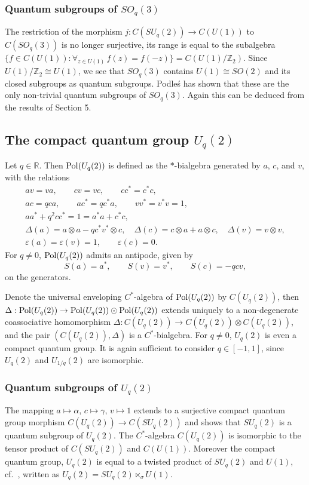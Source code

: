 \documentclass[12pt]{amsart}
\theoremstyle{definition}
\theoremstyle{remark}
\numberwithin{equation}{section}
\begin{document}
\subsubsection{Quantum subgroups of $SO_q(3)$}
The restriction of the morphism $j:C(SU_q(2))\to C(U(1))$ to $C(SO_q(3))$ is no longer surjective, its range is 
equal to the subalgebra $\{f\in C(U(1)): \forall_{z\in U(1)}\, f(z)=f(-z)\}=C(U(1)/\mathbb{Z}_2)$. Since 
$U(1)/\mathbb{Z}_2\cong U(1)$, we see that $SO_q(3)$ contains $U(1)\cong SO(2)$ and its closed subgroups as 
quantum subgroups. Podle\'s  \cite{podles95} has shown that these are the only non-trivial quantum subgroups of 
$SO_q(3)$. Again this can be deduced from the results of Section 5.

\subsection{The compact quantum group $U_q(2)$}

\cite{koelink91,wysoczanski04,zhang+zhao05} Let $q\in \mathbb{R}$. Then ${\rm
Pol} (U_q(2))$ is defined as the $*$-bialgebra generated by $a$, $c$, and
$v$, with the relations
\begin{gather*}
av=va, \qquad cv = vc, \qquad cc^* = c^*c , \\
ac=qca, \qquad a c^* = qc^* a, \qquad vv^* = v^*v= 1, \\
aa^* + q^2cc^* =  1 = a^*a + c^*c, \\
\Delta(a) = a\otimes a-qc^*v^* \otimes c, \quad \Delta (c) = c\otimes a + a
\otimes c, \quad \Delta(v)=v\otimes v, \\
\varepsilon(a)=\varepsilon(v)=1, \qquad \varepsilon(c)=0.
\end{gather*}
For $q\not=0$, ${\rm Pol} (U_q(2))$ admits an antipode, given by
\[
S(a) = a^*, \qquad S(v)=v^*,\qquad S(c)= -qcv,
\]
on the generators.

Denote the universal enveloping $C^*$-algebra of ${\rm Pol}(U_q(2))$ by
$C(U_q(2))$, then $\Delta:{\rm Pol} (U_q(2))\to {\rm Pol}(U_q(2))\odot{\rm
  Pol}(U_q(2))$ extends uniquely to a non-degenerate coassociative
homomorphism $\Delta:C(U_q(2))\to C(U_q(2))\otimes C(U_q(2))$, and the pair
$(C(U_q(2)),\Delta)$ is a $C^*$-bialgebra. For $q\not=0$, $U_q(2)$ is even
a compact quantum group. It is again sufficient to consider $q\in [-1,1]$,
since $U_q(2)$ and $U_{1/q}(2)$ are isomorphic.

\subsubsection{Quantum subgroups of $U_q(2)$}
The mapping $a\mapsto\alpha$, $c\mapsto \gamma$, $v\mapsto 1$ extends to a surjective compact quantum group 
morphism $C(U_q(2))\to C(SU_q(2))$ and shows that $SU_q(2)$ is a quantum subgroup of $U_q(2)$. The $C^*$-algebra 
$C(U_q(2))$ is isomorphic to the tensor product of $C(SU_q(2))$ and $C(U(1))$. Moreover the compact quantum 
group, $U_q(2)$  is equal to a twisted product of $SU_q(2)$ and $U(1)$, cf.\ \cite{wysoczanski04}, written as 
$U_q(2)=SU_q(2)\ltimes_\sigma U(1)$.
\end{document}
